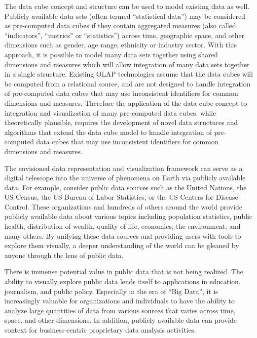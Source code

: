 \documentclass[12pt]{article}
\begin{document}
\begin{doublespace}
The data cube concept and structure can be used to model existing data as well. Publicly available data sets (often termed ``statistical data'') may be considered as pre-computed data cubes if they contain aggregated measures (also called ``indicators'', ``metrics'' or ``statistics'') across time, geographic space, and other dimensions such as gender, age range, ethnicity or industry sector. With this approach, it is possible to model many data sets together using shared dimensions and measures which will allow integration of many data sets together in a single structure. Existing OLAP technologies assume that the data cubes will be computed from a relational source, and are not designed to handle integration of pre-computed data cubes that may use inconsistent identifiers for common dimensions and measures. Therefore the application of the data cube concept to integration and visualization of many pre-computed data cubes, while theoretically plausible, requires the development of novel data structures and algorithms that extend the data cube model to handle integration of pre-computed data cubes that may use inconsistent identifiers for common dimensions and measures.

The envisioned data representation and visualization framework can serve as a digital telescope into the universe of phenomena on Earth via publicly available data. For example, consider public data sources such as the United Nations, the US Census, the US Bureau of Labor Statistics, or the US Centers for Disease Control. These organizations and hundreds of others around the world provide publicly available data about various topics including population statistics, public health, distribution of wealth, quality of life, economics, the environment, and many others. By unifying these data sources and providing users with tools to explore them visually, a deeper understanding of the world can be gleaned by anyone through the lens of public data.

There is immense potential value in public data that is not being realized. The ability to visually explore public data lends itself to applications in education, journalism, and public policy. Especially in the era of ``Big Data'', it is increasingly valuable for organizations and individuals to have the ability to analyze large quantities of data from various sources that varies across time, space, and other dimensions. In addition, publicly available data can provide context for business-centric proprietary data analysis activities.


\end{doublespace}
\end{document}
